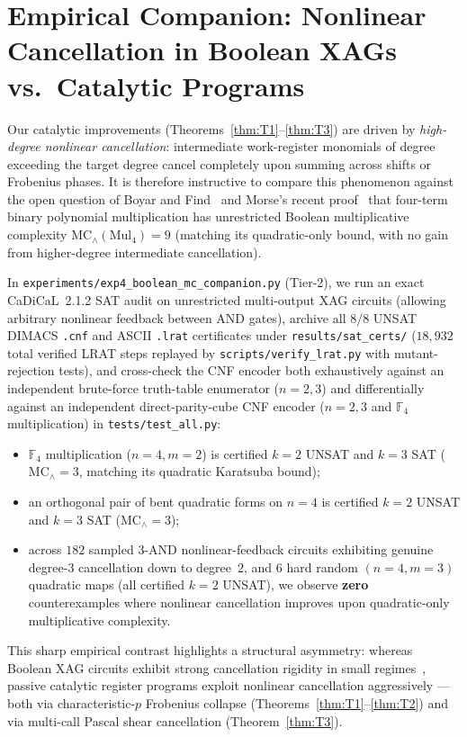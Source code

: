 \documentclass[11pt,reqno]{amsart}
\theoremstyle{definition}
\newcommand{\F}{\mathbb{F}}
\newcommand{\MC}{\mathrm{MC}_\wedge}
\begin{document}
\section{Empirical Companion: Nonlinear Cancellation in Boolean XAGs vs.\ Catalytic Programs}
\label{sec:companion}

Our catalytic improvements (Theorems~\ref{thm:T1}--\ref{thm:T3}) are driven by \emph{high-degree nonlinear cancellation}: intermediate work-register monomials of degree exceeding the target degree cancel completely upon summing across shifts or Frobenius phases.
It is therefore instructive to compare this phenomenon against the open question of Boyar and Find~\cite{BoyarFind2018} and Morse's recent proof~\cite{Morse2026} that four-term binary polynomial multiplication has unrestricted Boolean multiplicative complexity $\MC(\mathrm{Mul}_4) = 9$ (matching its quadratic-only bound, with no gain from higher-degree intermediate cancellation).

In \texttt{experiments/exp4\_boolean\_mc\_companion.py} (Tier-2), we run an exact CaDiCaL~2.1.2 SAT audit on unrestricted multi-output XAG circuits (allowing arbitrary nonlinear feedback between AND gates), archive all $8/8$ UNSAT DIMACS \texttt{.cnf} and ASCII \texttt{.lrat} certificates under \texttt{results/sat\_certs/} ($18{,}932$ total verified LRAT steps replayed by \texttt{scripts/verify\_lrat.py} with mutant-rejection tests), and cross-check the CNF encoder both exhaustively against an independent brute-force truth-table enumerator ($n = 2, 3$) and differentially against an independent direct-parity-cube CNF encoder ($n = 2, 3$ and $\F_4$ multiplication) in \texttt{tests/test\_all.py}:
\begin{itemize}
  \item $\F_4$ multiplication ($n = 4, m = 2$) is certified $k = 2$ UNSAT and $k = 3$ SAT ($\MC = 3$, matching its quadratic Karatsuba bound);
  \item an orthogonal pair of bent quadratic forms on $n = 4$ is certified $k = 2$ UNSAT and $k = 3$ SAT ($\MC = 3$);
  \item across $182$ sampled $3$-AND nonlinear-feedback circuits exhibiting genuine degree-$3$ cancellation down to degree~$2$, and $6$ hard random $(n = 4, m = 3)$ quadratic maps (all certified $k = 2$ UNSAT), we observe \textbf{zero} counterexamples where nonlinear cancellation improves upon quadratic-only multiplicative complexity.
\end{itemize}
This sharp empirical contrast highlights a structural asymmetry: whereas Boolean XAG circuits exhibit strong cancellation rigidity in small regimes~\cite{BoyarFind2018,Morse2026}, passive catalytic register programs exploit nonlinear cancellation aggressively --- both via characteristic-$p$ Frobenius collapse (Theorems~\ref{thm:T1}--\ref{thm:T2}) and via multi-call Pascal shear cancellation (Theorem~\ref{thm:T3}).
\end{document}
